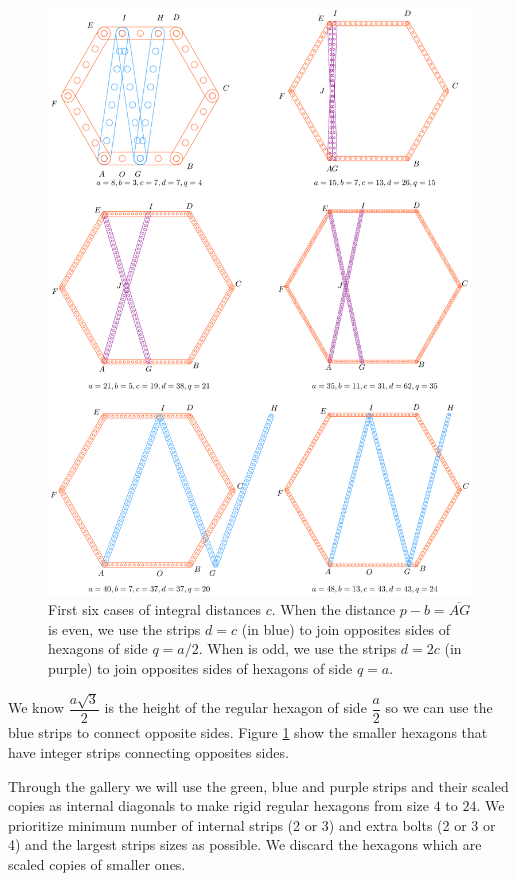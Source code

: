 \documentclass[11pt]{article}
\begin{document}
\begin{figure}[H]
\centering
\includegraphics[scale=0.8]{build/hexa-builder-b}
\caption{First six cases of integral distances $c$. When the distance $p-b = \overline{AG}$ is even, we use the strips $d = c$ (in blue) to join opposites sides of hexagons of side $q = a/2$. When is odd, we use the strips $d = 2c$ (in purple) to join opposites sides of hexagons of side $q = a$.}
\label{fig:builder-b}
\end{figure}

We know $\dfrac{a\sqrt3}2$ is the height of the regular hexagon of side $\dfrac{a}2$ so we can use the blue strips to connect opposite sides. Figure \ref{fig:builder-b} show the smaller hexagons that have integer strips connecting opposites sides.

Through the gallery we will use the green, blue and purple strips and their scaled copies as internal diagonals to make rigid regular hexagons from size $4$ to $24$. We prioritize minimum number of internal strips (2 or 3) and extra bolts (2 or 3 or 4) and the largest strips sizes as possible. We discard the hexagons which are scaled copies of smaller ones.
\end{document}
